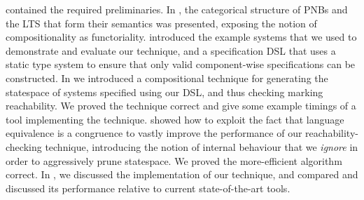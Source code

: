  contained the required preliminaries. In
, the categorical structure of PNBs and the LTS that
form their semantics was presented, exposing the notion of compositionality as
functoriality.  introduced the example systems
that we used to demonstrate and evaluate our technique, and a specification DSL
that uses a static type system to ensure that only valid component-wise
specifications can be constructed. In  we introduced a
compositional technique for generating the statespace of systems specified
using our DSL, and thus checking marking reachability. We proved the technique
correct and give some example timings of a tool implementing the technique.
 showed how to exploit the fact that language
equivalence is a congruence to vastly improve the performance of our
reachability-checking technique, introducing the notion of internal behaviour
that we \emph{ignore} in order to aggressively prune statespace. We proved the
more-efficient algorithm correct. In , we
discussed the implementation of our technique, and compared and discussed its
performance relative to current state-of-the-art tools.

{}
